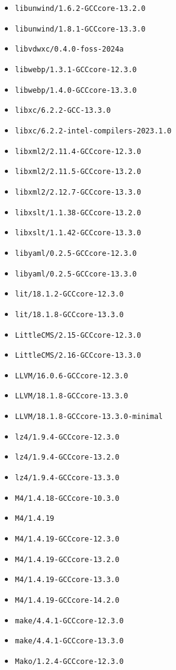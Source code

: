 \begin{multicols}{3}
\begin{itemize}
\item \verb|libunwind/1.6.2-GCCcore-13.2.0|
\item \verb|libunwind/1.8.1-GCCcore-13.3.0|
\item \verb|libvdwxc/0.4.0-foss-2024a|
\item \verb|libwebp/1.3.1-GCCcore-12.3.0|
\item \verb|libwebp/1.4.0-GCCcore-13.3.0|
\item \verb|libxc/6.2.2-GCC-13.3.0|
\item \verb|libxc/6.2.2-intel-compilers-2023.1.0|
\item \verb|libxml2/2.11.4-GCCcore-12.3.0|
\item \verb|libxml2/2.11.5-GCCcore-13.2.0|
\item \verb|libxml2/2.12.7-GCCcore-13.3.0|
\item \verb|libxslt/1.1.38-GCCcore-13.2.0|
\item \verb|libxslt/1.1.42-GCCcore-13.3.0|
\item \verb|libyaml/0.2.5-GCCcore-12.3.0|
\item \verb|libyaml/0.2.5-GCCcore-13.3.0|
\item \verb|lit/18.1.2-GCCcore-12.3.0|
\item \verb|lit/18.1.8-GCCcore-13.3.0|
\item \verb|LittleCMS/2.15-GCCcore-12.3.0|
\item \verb|LittleCMS/2.16-GCCcore-13.3.0|
\item \verb|LLVM/16.0.6-GCCcore-12.3.0|
\item \verb|LLVM/18.1.8-GCCcore-13.3.0|
\item \verb|LLVM/18.1.8-GCCcore-13.3.0-minimal|
\item \verb|lz4/1.9.4-GCCcore-12.3.0|
\item \verb|lz4/1.9.4-GCCcore-13.2.0|
\item \verb|lz4/1.9.4-GCCcore-13.3.0|
\item \verb|M4/1.4.18-GCCcore-10.3.0|
\item \verb|M4/1.4.19|
\item \verb|M4/1.4.19-GCCcore-12.3.0|
\item \verb|M4/1.4.19-GCCcore-13.2.0|
\item \verb|M4/1.4.19-GCCcore-13.3.0|
\item \verb|M4/1.4.19-GCCcore-14.2.0|
\item \verb|make/4.4.1-GCCcore-12.3.0|
\item \verb|make/4.4.1-GCCcore-13.3.0|
\item \verb|Mako/1.2.4-GCCcore-12.3.0|

\end{itemize}
\end{multicols}
